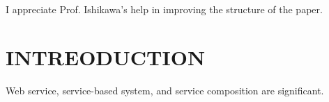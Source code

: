 \documentclass[senior,final,11pt]{iscs-thesis}
\begin{document}
\begin{acknowledge}
I appreciate Prof. Ishikawa's help in improving the structure of the paper.
\end{acknowledge}

\frontmatter 
\tableofcontents
\mainmatter 

\chapter{INTREODUCTION}
Web service, service-based system, and service composition are significant.







\end{document}
